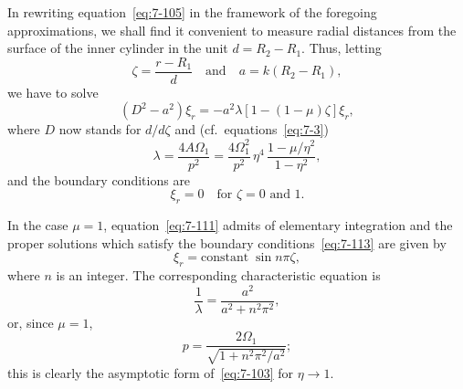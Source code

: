 In rewriting equation~\eqref{eq:7-105} in the framework of the foregoing approximations, we shall find it convenient to measure radial distances from the
surface of the inner cylinder in the unit $d = R_2-R_1$.  Thus, letting
\begin{equation}
\label{eq:7-110}
\zeta = \frac{r-R_1}{d} \quad \text{and} \quad a = k(R_2-R_1),
\end{equation}
we have to solve
\begin{equation}
\label{eq:7-111}
(D^2-a^2)\xi_r = -a^2\lambda[1-(1-\mu)\zeta]\xi_r,
\end{equation}
where $D$ now stands for $d/d\zeta$ and (cf.\ equations~\eqref{eq:7-3})
\begin{equation}
\label{eq:7-112}
\lambda = \frac{4A\Omega_1}{p^2} = \frac{4\Omega_1^2}{p^2}\,\eta^4\,
\frac{1-\mu/\eta^2}{1-\eta^2},
\end{equation}
and the boundary conditions are
\begin{equation}
\label{eq:7-113}
\xi_r = 0 \quad \text{for } \zeta = 0 \text{ and } 1.
\end{equation}

In the case $\mu = 1$, equation~\eqref{eq:7-111} admits of elementary integration
and the proper solutions which satisfy the boundary conditions~\eqref{eq:7-113} are
given by
\begin{equation}
\label{eq:7-114}
\xi_r = \text{constant}\;\sin n\pi\zeta,
\end{equation}
where $n$ is an integer.  The corresponding characteristic equation is
\begin{equation}
\label{eq:7-115}
\frac{1}{\lambda} = \frac{a^2}{a^2+n^2\pi^2},
\end{equation}
or, since $\mu = 1$,
\begin{equation}
\label{eq:7-116}
p = \frac{2\Omega_1}{\sqrt{1+n^2\pi^2/a^2}};
\end{equation}
this is clearly the asymptotic form of~\eqref{eq:7-103} for $\eta \to 1$.

